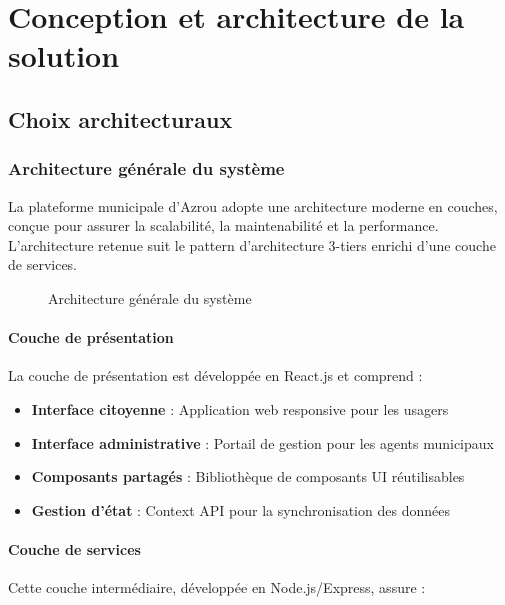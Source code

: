 \chapter{Conception et architecture de la solution}

\section{Choix architecturaux}

\subsection{Architecture générale du système}

La plateforme municipale d'Azrou adopte une architecture moderne en couches, conçue pour assurer la scalabilité, la maintenabilité et la performance. L'architecture retenue suit le pattern d'architecture 3-tiers enrichi d'une couche de services.

\begin{figure}[H]
\centering
\caption{Architecture générale du système}
\label{fig:architecture-generale}
\end{figure}

\subsubsection{Couche de présentation}

La couche de présentation est développée en React.js et comprend :

\begin{itemize}
\item \textbf{Interface citoyenne} : Application web responsive pour les usagers
\item \textbf{Interface administrative} : Portail de gestion pour les agents municipaux
\item \textbf{Composants partagés} : Bibliothèque de composants UI réutilisables
\item \textbf{Gestion d'état} : Context API pour la synchronisation des données
\end{itemize}

\subsubsection{Couche de services}

Cette couche intermédiaire, développée en Node.js/Express, assure :

